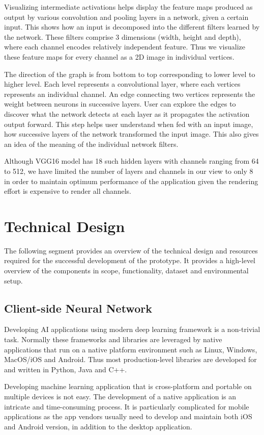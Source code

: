 Visualizing intermediate activations helps display the feature maps produced as output by various convolution and pooling layers in a network, given a certain input. This shows how an input is decomposed into the different filters learned by the network. These filters comprise 3 dimensions (width, height and depth), where each channel encodes relatively independent feature. Thus we visualize these feature maps for every channel as a 2D image in individual vertices.

The direction of the graph is from bottom to top corresponding to lower level to higher level. Each level represents a convolutional layer, where each vertices represents an individual channel. An edge connecting two vertices represents the weight between neurons in successive layers. User can explore the edges to discover what the network detects at each layer as it propagates the activation output forward. This step helps user understand when fed with an input image, how successive layers of the network transformed the input image. This also gives an idea of the meaning of the individual network filters.

Although VGG16 model has 18 such hidden layers with channels ranging from 64 to 512, we have limited the number of layers and channels in our view to only 8 in order to maintain optimum performance of the application given the rendering effort is expensive to render all channels.


\section{Technical Design}
The following segment provides an overview of the technical design and resources required for the successful development of the prototype. It provides a high-level overview of the components in scope, functionality, dataset and environmental setup.

\subsection{Client-side Neural Network}
Developing AI applications using modern deep learning framework is a non-trivial task. Normally these frameworks and libraries are leveraged by native applications that run on a native platform environment such as Linux, Windows, MacOS/iOS and Android. Thus most production-level libraries are developed for and written in Python, Java and C++. 

Developing machine learning application that is cross-platform and portable on multiple devices is not easy. The development of a native application is an intricate and time-consuming process. It is particularly complicated for mobile applications as the app vendors usually need to develop and maintain both iOS and Android version, in addition to the desktop application.

